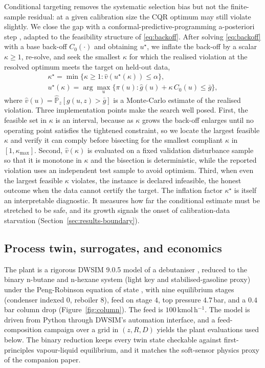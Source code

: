 Conditional targeting removes the systematic selection bias but not the finite-sample
residual: at a given calibration size the CQR optimum may still violate slightly. We close
the gap with a conformal-predictive-programming a-posteriori step \citep{zhao2024cpp},
adapted to the feasibility structure of \eqref{eq:backoff}. After solving
\eqref{eq:backoff} with a base back-off $C_0(\cdot)$ and obtaining $u^\star$, we inflate the
back-off by a scalar $\kappa\ge 1$, re-solve, and seek the smallest $\kappa$ for which the
realised violation at the resolved optimum meets the target on held-out data,
\begin{equation*}
\begin{gathered}
\kappa^\star=\min\big\{\kappa\ge 1 : \hat v(u^\star(\kappa))\le\alpha\big\},\\[2pt]
u^\star(\kappa)=\arg\max_{u}\big\{\pi(u):\hat g(u)+\kappa\,C_0(u)\le\bar g\big\},
\end{gathered}
\end{equation*}
where $\hat v(u)=\widehat{\mathbb{P}}_z[g(u,z)>\bar g]$ is a Monte-Carlo estimate of the
realised violation. Three implementation points make the search well posed. First, the
feasible set in $\kappa$ is an interval, because as $\kappa$ grows the back-off enlarges
until no operating point satisfies the tightened constraint, so we locate the largest
feasible $\kappa$ and verify it can comply before bisecting for the smallest compliant
$\kappa$ in $[1,\kappa_{\max}]$. Second, $\hat v(\kappa)$ is evaluated on a fixed validation
disturbance sample so that it is monotone in $\kappa$ and the bisection is deterministic,
while the reported violation uses an independent test sample to avoid optimism. Third, when
even the largest feasible $\kappa$ violates, the instance is declared infeasible, the honest
outcome when the data cannot certify the target. The inflation factor $\kappa^\star$ is
itself an interpretable diagnostic. It measures how far the conditional estimate must be
stretched to be safe, and its growth signals the onset of calibration-data starvation
(Section~\ref{sec:results-boundary}).

\subsection{Process twin, surrogates, and economics}
\label{sec:methods-twin}

The plant is a rigorous DWSIM 9.0.5 model of a debutaniser \citep{dwsim}, reduced to the
binary n-butane and n-hexane system (light key and stabilised-gasoline proxy) under the
Peng-Robinson equation of state \citep{peng1976}, with nine equilibrium stages (condenser
indexed $0$, reboiler $8$), feed on stage $4$, top pressure $4.7$\,bar, and a $0.4$\,bar
column drop (Figure~\ref{fig:column}). The feed is $100$\,kmol\,h$^{-1}$. The model is driven
from Python through DWSIM's automation interface, and a feed-composition campaign over a grid
in $(z,R,D)$ yields the plant evaluations used below. The binary reduction keeps every twin
state checkable against first-principles vapour-liquid equilibrium, and it matches the
soft-sensor physics proxy of the companion paper.

